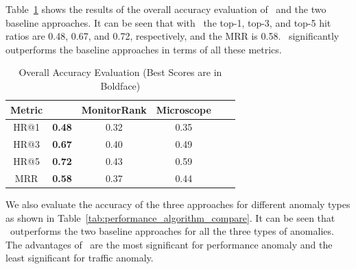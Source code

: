 Table~\ref{tab:accuracy} shows the results of the overall accuracy evaluation of \app~and the two baseline approaches.
It can be seen that with \app~the top-1, top-3, and top-5 hit ratios are 0.48, 0.67, and 0.72, respectively, and the MRR is 0.58.
\app~significantly outperforms the baseline approaches in terms of all these metrics.

\begin{table}[ht]
	\newcommand{\tabincell}[2]{\begin{tabular}{@{}#1@{}}#2\end{tabular}}
	\caption{Overall Accuracy Evaluation (Best Scores are in Boldface)}
	\label{tab:accuracy}
    \small
	\centering
		\begin{tabular}{|c|c|c|c|c|c|}
			\hline \textbf{Metric} & \textbf{\app~} & \textbf{MonitorRank} & \textbf{Microscope}  \\
			\hline HR@1   & \textbf{0.48}  & 0.32   & 0.35  \\
			\hline HR@3   & \textbf{0.67}  & 0.40   & 0.49  \\
			\hline HR@5   & \textbf{0.72}  & 0.43   & 0.59    \\
			\hline MRR & \textbf{0.58}  & 0.37   & 0.44  \\
			\hline
		\end{tabular}
	\vspace{-3pt}
\end{table}

We also evaluate the accuracy of the three approaches for different anomaly types as shown in Table~\ref{tab:performance_algorithm_compare}.
It can be seen that \app~outperforms the two baseline approaches for all the three types of anomalies.
The advantages of \app~are the most significant for performance anomaly and the least significant for traffic anomaly.

